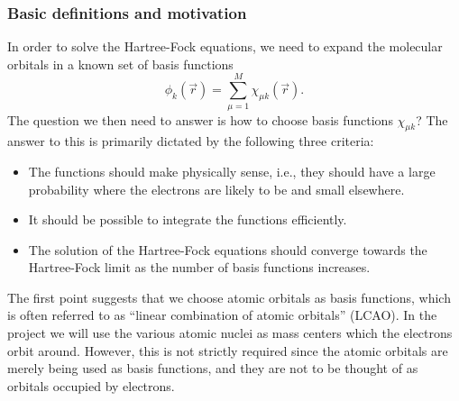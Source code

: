 \documentclass{beamer}
\begin{document}
\begin{frame}
\frametitle{Basic definitions and motivation}

\begin{block}{}

In order to solve the Hartree-Fock equations, we need to expand the molecular orbitals in a known
set of basis functions
\begin{equation}
 \phi_k(\vec r) = \sum_{\mu=1}^M\chi_{\mu k}(\vec r).
\end{equation}
The question we then need to answer is how to choose basis functions $\chi_{\mu k}$? The answer to this
is primarily dictated by the following three criteria:

\begin{itemize}
  \item The functions should make physically sense, i.e., they should have a large probability where   the electrons are likely to be and small elsewhere.

  \item It should be possible to integrate the functions efficiently.

  \item The solution of the Hartree-Fock equations should converge towards the Hartree-Fock limit        as the number of basis functions increases.
\end{itemize}

\noindent
The first point suggests that we choose atomic orbitals as basis functions,  which is often
referred to as ``linear combination of atomic orbitals'' (LCAO). In the project we will use the various atomic nuclei as mass centers which the electrons orbit around. However, this is not strictly required since the
atomic orbitals are merely being used as basis functions, and they are not to be thought of
as orbitals occupied by electrons. 
\end{block}
\end{frame}
\end{document}
